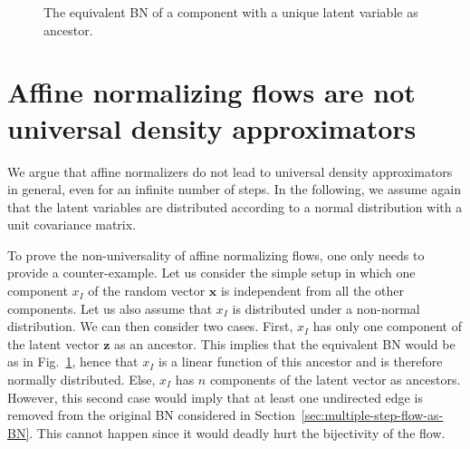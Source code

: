 \documentclass{article}
\newcommand{\mb}{\boldsymbol}
\newcommand{\figref}[1]{Fig.~\ref{#1}}
\begin{document}
\begin{figure}
    \centering
    \hspace{-1.5em}

    \caption{The equivalent BN of a component with a unique latent variable as ancestor.}
    \label{fig:BN-x-I}
    \vspace{-2.2em}
\end{figure}

\section{Affine normalizing flows are not universal density approximators}

We argue that affine normalizers do not lead to universal density approximators in general, even for an infinite number of steps. In the following, we assume again that the latent variables are distributed according to a normal distribution with a unit covariance matrix.


To prove the non-universality of affine normalizing flows, one only needs to provide a counter-example.
Let us consider the simple setup in which one component $x_I$ of the random vector $\mb x$ is independent from all the other components.
Let us also assume that $x_I$ is distributed under a non-normal distribution.
We can then consider two cases.
First, $x_I$ has only one component of the latent vector $\mb z$ as an ancestor. This implies that the equivalent BN would be as in \figref{fig:BN-x-I}, hence that $x_I$ is a linear function of this ancestor and is therefore normally distributed.
Else, $x_I$ has $n$ components of the latent vector as ancestors.
However, this second case would imply that at least one undirected edge is removed from the original BN considered in Section~\ref{sec:multiple-step-flow-as-BN}.
This cannot happen since it would deadly hurt the bijectivity of the flow.
\end{document}
